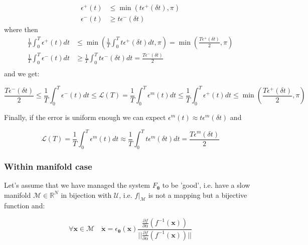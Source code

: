 \documentclass{article} %
\newcounter{ct}
\newcommand{\manifold}{\mathcal{M}}
\theoremstyle{definition}
\theoremstyle{remark}
\begin{document}
\begin{equation}
\begin{split}
    \epsilon^+(t) &\leq \min(t\epsilon^+(\delta t), \pi) \\
    \epsilon^-(t) &\geq t\epsilon^-(\delta t)
\end{split}
\end{equation}
where 
then 
\begin{equation}
\begin{split}
    \frac{1}{T} \int_0^{T} \epsilon^+(t)dt &\leq  \min \left( \frac{1}{T} \int_0^{T} t\epsilon^+(\delta t)dt, \pi \right) = \min \left( \frac{T \epsilon^+(\delta t)}{2}, \pi \right) \\
    \frac{1}{T} \int_0^{T} \epsilon^-(t)dt &\geq  \frac{1}{T} \int_0^{T} t\epsilon^-(\delta t)dt  = \frac{T \epsilon^-(\delta t)}{2} \\
\end{split}
\end{equation}
and we get: 

\begin{equation}
    \frac{T \epsilon^-(\delta t)}{2} \leq \frac{1}{T} \int_0^{T} \epsilon^-(t)dt \leq \mathcal{L}(T) = \frac{1}{T} \int_0^{T} \epsilon^{m}(t) dt \leq  \frac{1}{T} \int_0^{T} \epsilon^+(t) dt \leq \min \left( \frac{T \epsilon^+(\delta t)}{2}, \pi \right)
\end{equation}

Finally, if the error is uniform enough we can expect $\epsilon^{m}(t) \approx t\epsilon^m(\delta t)$ and

\begin{equation}
    \mathcal{L}(T) = \frac{1}{T} \int_0^{T} \epsilon^{m}(t) dt \approx  \frac{1}{T} \int_0^{T} t\epsilon^m(\delta t)dt = \frac{T \epsilon^m(\delta t)}{2}
\end{equation}

\subsubsection{Within manifold case}
Let's assume that we have managed the system $F_{\boldsymbol{\theta}}$ to be 'good', i.e. have a slow manifold $\manifold \in \mathbb{R}^N$ in bijection with $\mathcal{U}$, i.e. $f|_{\manifold}$ is not a mapping but a bijective function and:

\begin{equation}
\forall \bm{x} \in \manifold \quad \dot{\bm{x}} = \epsilon_{\bm{\theta}}(\bm{x})\frac{\frac{\partial f}{\partial \alpha}(f^{-1}(\bm{x}))}{||\frac{\partial f}{\partial \alpha}(f^{-1}(\bm{x}))||}
\end{equation}
\end{document}
